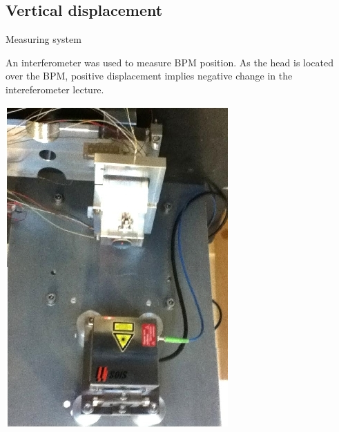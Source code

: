 \documentclass[a4paper,11pt]{book}
\begin{document}
\subsection{Vertical displacement}
Measuring system\par
An interferometer was used to measure BPM position. As the head is located over the BPM, positive displacement implies negative change in the intereferometer lecture.\par
\hspace*{1.4cm}\includegraphics[angle=180,scale=0.2]{interfero.jpg}\par
\end{document}
